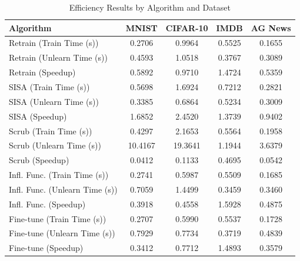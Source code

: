 \begin{table}[t]
\centering
\caption{Efficiency Results by Algorithm and Dataset}
\label{tab:efficiency_results}
\small
\begin{tabular}{lcccc}
\toprule
Algorithm & MNIST & CIFAR-10 & IMDB & AG News \\
\midrule
Retrain (Train Time (s)) & 0.2706 & 0.9964 & 0.5525 & 0.1655 \\
Retrain (Unlearn Time (s)) & 0.4593 & 1.0518 & 0.3767 & 0.3089 \\
Retrain (Speedup) & 0.5892 & 0.9710 & 1.4724 & 0.5359 \\
SISA (Train Time (s)) & 0.5698 & 1.6924 & 0.7212 & 0.2821 \\
SISA (Unlearn Time (s)) & 0.3385 & 0.6864 & 0.5234 & 0.3009 \\
SISA (Speedup) & 1.6852 & 2.4520 & 1.3739 & 0.9402 \\
Scrub (Train Time (s)) & 0.4297 & 2.1653 & 0.5564 & 0.1958 \\
Scrub (Unlearn Time (s)) & 10.4167 & 19.3641 & 1.1944 & 3.6379 \\
Scrub (Speedup) & 0.0412 & 0.1133 & 0.4695 & 0.0542 \\
Infl. Func. (Train Time (s)) & 0.2741 & 0.5987 & 0.5509 & 0.1685 \\
Infl. Func. (Unlearn Time (s)) & 0.7059 & 1.4499 & 0.3459 & 0.3460 \\
Infl. Func. (Speedup) & 0.3918 & 0.4558 & 1.5928 & 0.4875 \\
Fine-tune (Train Time (s)) & 0.2707 & 0.5990 & 0.5537 & 0.1728 \\
Fine-tune (Unlearn Time (s)) & 0.7929 & 0.7734 & 0.3719 & 0.4839 \\
Fine-tune (Speedup) & 0.3412 & 0.7712 & 1.4893 & 0.3579 \\
\bottomrule
\end{tabular}
\end{table}
